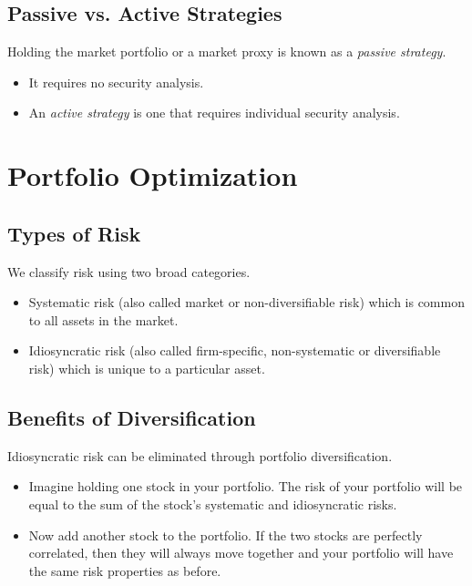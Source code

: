 \documentclass[letterpaper,10pt,english]{sphinxmanual}
\begin{document}
\subsection{Passive vs. Active Strategies}
\label{allocation:passive-vs-active-strategies}
Holding the market portfolio or a market proxy is known as a \emph{passive
strategy}.
\begin{itemize}
\item {} 
It requires no security analysis.

\end{itemize}
\begin{itemize}
\item {} 
An \emph{active strategy} is one that requires individual security
analysis.

\end{itemize}


\section{Portfolio Optimization}
\label{portfolioOpt:portfolio-optimization}\label{portfolioOpt::doc}

\subsection{Types of Risk}
\label{portfolioOpt:types-of-risk}
We classify risk using two broad categories.
\begin{itemize}
\item {} 
Systematic risk (also called market or non-diversifiable risk) which
is common to all assets in the market.

\end{itemize}
\begin{itemize}
\item {} 
Idiosyncratic risk (also called firm-specific, non-systematic or
diversifiable risk) which is unique to a particular asset.

\end{itemize}


\subsection{Benefits of Diversification}
\label{portfolioOpt:benefits-of-diversification}
Idiosyncratic risk can be eliminated through portfolio
diversification.
\begin{itemize}
\item {} 
Imagine holding one stock in your portfolio. The risk of your
portfolio will be equal to the sum of the stock's systematic and
idiosyncratic risks.

\end{itemize}
\begin{itemize}
\item {} 
Now add another stock to the portfolio. If the two stocks are
perfectly correlated, then they will always move together and your
portfolio will have the same risk properties as before.

\end{itemize}
\end{document}
